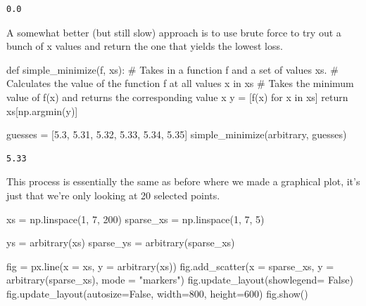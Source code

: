 \documentclass[
  letterpaper,
  DIV=11,
  numbers=noendperiod]{scrreprt}
\newenvironment{Shaded}{\begin{snugshade}}{\end{snugshade}}
\newcommand{\CommentTok}[1]{\textcolor[rgb]{0.37,0.37,0.37}{#1}}
\newcommand{\ControlFlowTok}[1]{\textcolor[rgb]{0.00,0.23,0.31}{#1}}
\newcommand{\DecValTok}[1]{\textcolor[rgb]{0.68,0.00,0.00}{#1}}
\newcommand{\FloatTok}[1]{\textcolor[rgb]{0.68,0.00,0.00}{#1}}
\newcommand{\KeywordTok}[1]{\textcolor[rgb]{0.00,0.23,0.31}{#1}}
\newcommand{\NormalTok}[1]{\textcolor[rgb]{0.00,0.23,0.31}{#1}}
\newcommand{\OperatorTok}[1]{\textcolor[rgb]{0.37,0.37,0.37}{#1}}
\newcommand{\StringTok}[1]{\textcolor[rgb]{0.13,0.47,0.30}{#1}}
\newcommand{\VariableTok}[1]{\textcolor[rgb]{0.07,0.07,0.07}{#1}}
\begin{document}
\begin{verbatim}
0.0
\end{verbatim}

A somewhat better (but still slow) approach is to use brute force to try
out a bunch of x values and return the one that yields the lowest loss.

\begin{Shaded}
\begin{Highlighting}[]
\KeywordTok{def}\NormalTok{ simple\_minimize(f, xs):}
    \CommentTok{\# Takes in a function f and a set of values xs. }
    \CommentTok{\# Calculates the value of the function f at all values x in xs}
    \CommentTok{\# Takes the minimum value of f(x) and returns the corresponding value x }
\NormalTok{    y }\OperatorTok{=}\NormalTok{ [f(x) }\ControlFlowTok{for}\NormalTok{ x }\KeywordTok{in}\NormalTok{ xs]  }
    \ControlFlowTok{return}\NormalTok{ xs[np.argmin(y)]}

\NormalTok{guesses }\OperatorTok{=}\NormalTok{ [}\FloatTok{5.3}\NormalTok{, }\FloatTok{5.31}\NormalTok{, }\FloatTok{5.32}\NormalTok{, }\FloatTok{5.33}\NormalTok{, }\FloatTok{5.34}\NormalTok{, }\FloatTok{5.35}\NormalTok{]}
\NormalTok{simple\_minimize(arbitrary, guesses)}
\end{Highlighting}
\end{Shaded}

\begin{verbatim}
5.33
\end{verbatim}

This process is essentially the same as before where we made a graphical
plot, it's just that we're only looking at 20 selected points.

\begin{Shaded}
\begin{Highlighting}[]
\NormalTok{xs }\OperatorTok{=}\NormalTok{ np.linspace(}\DecValTok{1}\NormalTok{, }\DecValTok{7}\NormalTok{, }\DecValTok{200}\NormalTok{)}
\NormalTok{sparse\_xs }\OperatorTok{=}\NormalTok{ np.linspace(}\DecValTok{1}\NormalTok{, }\DecValTok{7}\NormalTok{, }\DecValTok{5}\NormalTok{)}

\NormalTok{ys }\OperatorTok{=}\NormalTok{ arbitrary(xs)}
\NormalTok{sparse\_ys }\OperatorTok{=}\NormalTok{ arbitrary(sparse\_xs)}

\NormalTok{fig }\OperatorTok{=}\NormalTok{ px.line(x }\OperatorTok{=}\NormalTok{ xs, y }\OperatorTok{=}\NormalTok{ arbitrary(xs))}
\NormalTok{fig.add\_scatter(x }\OperatorTok{=}\NormalTok{ sparse\_xs, y }\OperatorTok{=}\NormalTok{ arbitrary(sparse\_xs), mode }\OperatorTok{=} \StringTok{"markers"}\NormalTok{)}
\NormalTok{fig.update\_layout(showlegend}\OperatorTok{=} \VariableTok{False}\NormalTok{)}
\NormalTok{fig.update\_layout(autosize}\OperatorTok{=}\VariableTok{False}\NormalTok{, width}\OperatorTok{=}\DecValTok{800}\NormalTok{, height}\OperatorTok{=}\DecValTok{600}\NormalTok{)}
\NormalTok{fig.show()}
\end{Highlighting}
\end{Shaded}
\end{document}
